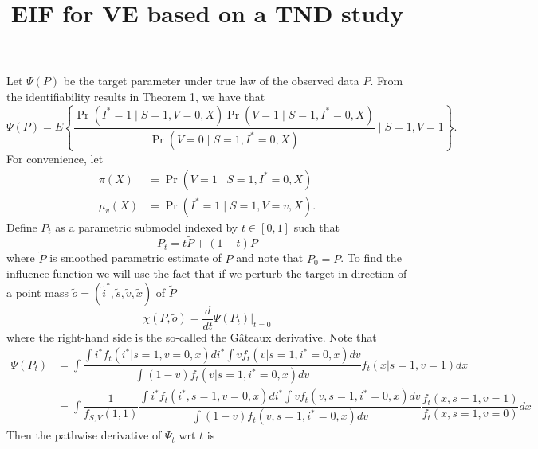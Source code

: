 \documentclass{article}
\title{EIF for VE based on a TND study}
\begin{document}
\maketitle


Let $\Psi(P)$ be the target parameter under true law of the observed data $P$. From the identifiability results in Theorem 1, we have that 
$$\Psi(P) = E\left\{\dfrac{\Pr(I^*=1\mid S=1, V=0, X)\Pr(V=1\mid S=1, I^*=0, X)}{\Pr(V=0\mid S=1, I^*=0, X)}\mid S=1, V=1\right\}.$$ 
For convenience, let
\begin{align*}
    \pi(X) &= \Pr(V=1\mid S=1, I^*=0, X) \\
    \mu_v(X) &= \Pr(I^*=1\mid S=1, V=v, X).
\end{align*}
Define $P_t$ as a parametric submodel indexed by $t \in [0,1]$ such that
$$P_t = t \widetilde{P} + (1 - t)P$$
where $\widetilde{P}$ is smoothed parametric estimate of $P$ and note that $P_0 = P$. To find the influence function we will use the fact that if we perturb the target in direction of a point mass $\widetilde{o} = (\widetilde{i}^*, \widetilde{s}, \widetilde{v}, \widetilde{x})$ of $\widetilde{P}$
$$ \chi(P, \widetilde{o}) = \frac{d}{dt} \Psi(P_t)\bigg\vert_{t=0}$$
where the right-hand side is the so-called the G\^{a}teaux derivative. Note that 
\begin{align*}
    \Psi(P_t) &= \int \dfrac{\int i^* f_t(i^* | s=1,v=0,x)di^* \int v f_t(v | s=1, i^*=0, x)dv}{\int(1 - v) f_t(v | s=1, i^*=0, x)dv}f_t(x|s=1,v=1)dx \\
    &= \int \dfrac{1}{f_{S,V}(1, 1)} \dfrac{\int i^* f_t(i^*, s=1,v=0,x)di^* \int v f_t(v, s=1, i^*=0, x)dv}{\int(1 - v) f_t(v, s=1, i^*=0, x)dv}\dfrac{f_t(x, s=1, v=1)}{f_t(x, s=1, v=0)}dx 
\end{align*}
Then the pathwise derivative of $\Psi_t$ wrt $t$ is
\end{document}
